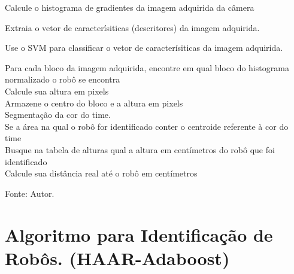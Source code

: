 \begin{algorithm}



{
Calcule o histograma de gradientes da imagem adquirida da câmera

Extraia o vetor de caracterísiticas (descritores) da imagem adquirida.

Use o SVM para classificar o vetor de caracterísiticas da imagem adquirida.

	{
		Para cada bloco da imagem adquirida, encontre em qual bloco do histograma normalizado o robô se encontra\\

		Calcule sua altura em pixels\\

		Armazene o centro do bloco e a altura em pixels\\

		Segmentação da cor do time.\\

		Se a área na qual o robô for identificado conter o centroide referente à cor do time\\

		Busque na tabela de alturas qual a altura em centímetros do robô que foi identificado\\

		Calcule sua distância real até o robô em centímetros\\
	}

}
\caption[Algoritmo para Identificação de Robôs. (HOG-SVM Online)]{Fonte: Autor.}
\label{lst:algROn}
\end{algorithm}


\chapter{Algoritmo para Identificação de Robôs. (HAAR-Adaboost)} \label{chap:apendiceHAAR}


